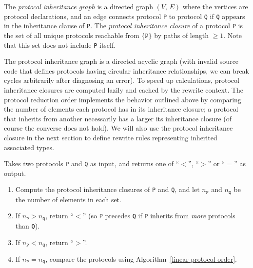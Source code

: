\documentclass[../generics]{subfiles}
\begin{document}
\begin{definition}
%
%
%
%
%
%
%
The \emph{protocol inheritance graph} is a directed graph $(V,\,E)$ where the vertices are protocol declarations, and an edge connects protocol \texttt{P} to protocol \texttt{Q} if \texttt{Q} appears in the inheritance clause of \texttt{P}. The \emph{protocol inheritance closure} of a protocol \texttt{P} is the set of all unique protocols reachable from $\{\texttt{P}\}$ by paths of length $\ge 1$. Note that this set does not include \texttt{P} itself.
\end{definition}
%
The protocol inheritance graph is a directed acyclic graph (with invalid source code that defines protocols having circular inheritance relationships, we can break cycles arbitrarily after diagnosing an error). To speed up calculations, protocol inheritance closures are computed lazily and cached by the rewrite context. The protocol reduction order implements the behavior outlined above by comparing the number of elements each protocol has in its inheritance closure; a protocol that inherits from another necessarily has a larger its inheritance closure (of course the converse does not hold). We will also use the protocol inheritance closure in the next section to define rewrite rules representing inherited associated types.
%
\begin{algorithm}\label{protocol reduction order} Takes two protocols \texttt{P} and \texttt{Q} as input, and returns one of ``$<$'', ``$>$'' or ``$=$'' as output.
\begin{enumerate}
\item Compute the protocol inheritance closures of \texttt{P} and \texttt{Q}, and let $n_\texttt{P}$ and $n_\texttt{Q}$ be the number of elements in each set.
\item If $n_\texttt{P}>n_\texttt{Q}$, return ``$<$'' (so \texttt{P} precedes \texttt{Q} if \texttt{P} inherits from \emph{more} protocols than \texttt{Q}).
\item If $n_\texttt{P}<n_\texttt{Q}$, return ``$>$''.
\item If $n_\texttt{P}=n_\texttt{Q}$, compare the protocols using Algorithm~\ref{linear protocol order}.
\end{enumerate}
\end{algorithm}
\end{document}
